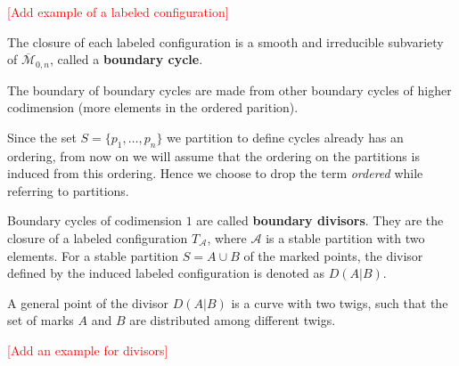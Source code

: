 \begin{example}
    \textcolor{red}{[Add example of a labeled configuration]}
\end{example}

\begin{definition}
    The closure of each labeled configuration is a smooth and irreducible subvariety of $\overline{\mathcal{M}}_{0,n}$, called a \textbf{boundary cycle}.
    \par The boundary of boundary cycles are made from other boundary cycles of higher codimension (more elements in the ordered parition).
\end{definition}

\begin{remark}
    Since the set $S = \{p_{1}, \dots, p_{n}\}$ we partition to define cycles already has an ordering, from now on we will assume that the ordering on the partitions is induced from this ordering. Hence we choose to drop the term \textit{ordered} while referring to partitions.
\end{remark}

\begin{definition}
    Boundary cycles of codimension $1$ are called \textbf{boundary divisors}. 
    They are the closure of a labeled configuration $T_{\mathcal{A}}$, where $\mathcal{A}$ is a stable partition with two elements.
    For a stable partition $S = A \cup B$ of the marked points, the divisor defined by the induced labeled configuration is denoted as $D(A|B)$.
    \par A general point of the divisor $D(A|B)$ is a curve with two twigs, such that the set of marks $A$ and $B$ are distributed among different twigs.
\end{definition}

\begin{example}
    \textcolor{red}{[Add an example for divisors]}
\end{example}

